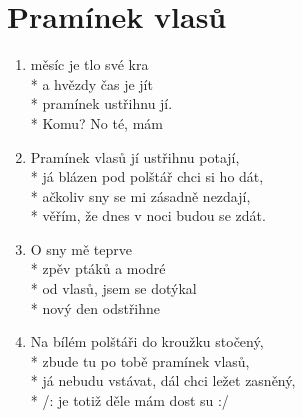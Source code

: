 \section{Pramínek vlasů}
\begin{enumerate}
\item {} měsíc je tlo své  kra \\*
a hvězdy  čas je jít   \\*
pramínek  ustřihnu jí. \\*
Komu? No  té, mám   
\item Pramínek vlasů jí ustřihnu potají, \\*
já blázen pod polštář chci si ho dát, \\*
ačkoliv sny se mi zásadně nezdají, \\*
věřím, že dnes v noci budou se zdát. 
\item O sny mě  teprve  \\*
zpěv ptáků  a modré  \\*
od vlasů,  jsem se dotýkal  \\*
nový den  odstřihne  
\item Na bílém polštáři do kroužku stočený, \\*
zbude tu po tobě pramínek vlasů, \\*
já nebudu vstávat, dál chci ležet zasněný, \\*
/: je totiž děle  mám dost su :/ 
\end{enumerate}
